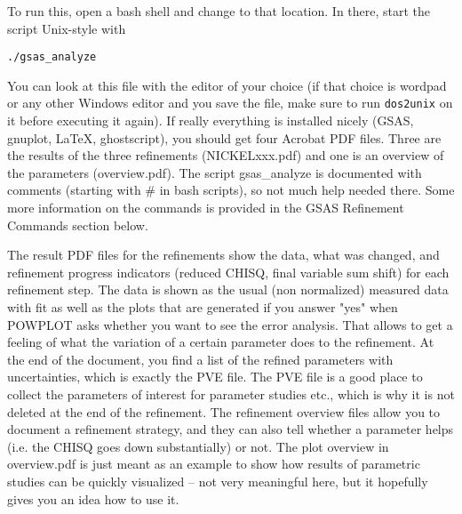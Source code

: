 To run this, open a bash shell and change to that location. In there, start the script Unix-style with

\texttt{./gsas\_analyze}

You can look at this file with the editor of your choice (if that choice is wordpad or any other Windows editor and you save the file, make sure to run \texttt{dos2unix} on it before executing it again). 
If really everything is installed nicely (GSAS, gnuplot, \LaTeX, ghostscript), you should get four Acrobat PDF files. Three are the results of the three refinements (NICKELxxx.pdf) and one is an overview of the parameters (overview.pdf). The script gsas\_analyze is documented with comments (starting with \# in bash scripts), so not much help needed there. Some more information on the commands is provided in the GSAS Refinement Commands section below. 

The result PDF files for the refinements show  the data, what was changed, and refinement progress indicators (reduced CHISQ, final variable sum shift) for each refinement step. The data is shown as the usual (non normalized) measured data with fit as well as the plots that are generated if you answer "yes" when POWPLOT asks whether you want to see the error analysis. That allows to get a feeling of what the variation of a certain parameter does to the refinement. At the end of the document, you find a list of the refined parameters with uncertainties, which is exactly the PVE file. The PVE file is a good place to collect the parameters of interest for parameter studies etc., which is why it is not deleted at the end of the refinement. The refinement overview files allow you to document a refinement strategy, and they can also tell whether a parameter helps (i.e. the CHISQ goes down substantially) or not. The plot overview in overview.pdf is just meant as an example to show how results of parametric studies can be quickly visualized -- not very meaningful here, but it hopefully gives you an idea how to use it.

